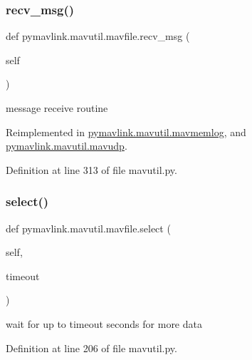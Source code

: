 \mbox{\label{classpymavlink_1_1mavutil_1_1mavfile_acf32945bf305666d12d8a1bf32ae6893}} 
\subsubsection{\texorpdfstring{recv\_msg()}{recv\_msg()}}
{\footnotesize\ttfamily def pymavlink.\+mavutil.\+mavfile.\+recv\+\_\+msg (\begin{DoxyParamCaption}\item[{}]{self }\end{DoxyParamCaption})}

\begin{DoxyVerb}message receive routine\end{DoxyVerb}
 

Reimplemented in \mbox{\hyperlink{classpymavlink_1_1mavutil_1_1mavmemlog_a7a84e52fc8bf9a84624c848c4a2229da}{pymavlink.\+mavutil.\+mavmemlog}}, and \mbox{\hyperlink{classpymavlink_1_1mavutil_1_1mavudp_aeb1b82765793d5de815c95caf6863953}{pymavlink.\+mavutil.\+mavudp}}.



Definition at line 313 of file mavutil.\+py.

\mbox{\label{classpymavlink_1_1mavutil_1_1mavfile_a205cfc15609088ced70b140c33c2c6d3}} 
\subsubsection{\texorpdfstring{select()}{select()}}
{\footnotesize\ttfamily def pymavlink.\+mavutil.\+mavfile.\+select (\begin{DoxyParamCaption}\item[{}]{self,  }\item[{}]{timeout }\end{DoxyParamCaption})}

\begin{DoxyVerb}wait for up to timeout seconds for more data\end{DoxyVerb}
 

Definition at line 206 of file mavutil.\+py.

